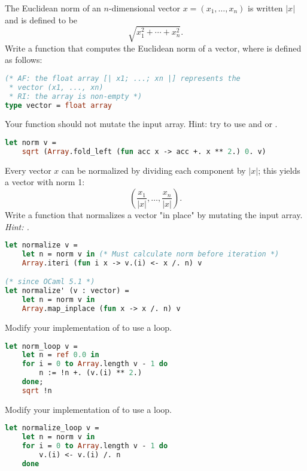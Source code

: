 \problem[norm]
The Euclidean norm of an $n$-dimensional vector $x = (x_1, \ldots, x_n)$ is written $|x|$ and is defined to be
\[\sqrt{x_1^2 + \cdots + x_n^2}.\]
Write a function  that computes the Euclidean norm of a vector, where  is defined as follows:
\begin{lstlisting}[language=OCaml]
(* AF: the float array [| x1; ...; xn |] represents the
 * vector (x1, ..., xn)
 * RI: the array is non-empty *)
type vector = float array
\end{lstlisting}
Your function should not mutate the input array. Hint: try to use  and  or .

\begin{lstlisting}[language=OCaml]
let norm v =
	sqrt (Array.fold_left (fun acc x -> acc +. x ** 2.) 0. v)
\end{lstlisting}

\problem[normalize]
Every vector $x$ can be normalized by dividing each component by $|x|$; this yields a vector with norm 1:
\[\left(\frac{x_1}{|x|}, \ldots, \frac{x_n}{|x|}\right).\]
Write a function  that normalizes a vector "in place" by mutating the input array. \textit{Hint: .}

\begin{lstlisting}[language=OCaml]
let normalize v =
	let n = norm v in (* Must calculate norm before iteration *)
	Array.iteri (fun i x -> v.(i) <- x /. n) v

(* since OCaml 5.1 *)
let normalize' (v : vector) =
	let n = norm v in
	Array.map_inplace (fun x -> x /. n) v
\end{lstlisting}

Modify your implementation of  to use a loop.

\begin{lstlisting}[language=OCaml]
let norm_loop v =
	let n = ref 0.0 in
	for i = 0 to Array.length v - 1 do
		n := !n +. (v.(i) ** 2.)
	done;
	sqrt !n
\end{lstlisting}

Modify your implementation of  to use a loop.

\begin{lstlisting}[language=OCaml]
let normalize_loop v =
	let n = norm v in
	for i = 0 to Array.length v - 1 do
		v.(i) <- v.(i) /. n
	done
\end{lstlisting}

